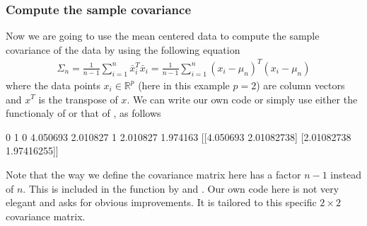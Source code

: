 \documentclass[letterpaper,10pt,english]{sphinxmanual}
\begin{document}
\subsubsection{Compute the sample covariance}
\label{\detokenize{chapter8:compute-the-sample-covariance}}
Now we are going to use the mean centered data to compute the sample covariance of the data by using the following equation
\begin{equation*}
\begin{split}
\Sigma_n = \frac{1}{n-1} \sum_{i=1}^n \bar{x}_i^T \bar{x}_i = \frac{1}{n-1} \sum_{i=1}^n (x_i - \mu_n)^T (x_i - \mu_n)
\end{split}
\end{equation*}
where the data points \(x_i \in \mathbb{R}^p\) (here in this example \(p = 2\)) are column vectors and \(x^T\) is the transpose of \(x\).
We can write our own code or simply use either the functionaly of  or that of , as follows

\begin{sphinxVerbatim}[commandchars=\\\{\}]
\end{sphinxVerbatim}

\begin{sphinxVerbatim}[commandchars=\\\{\}]
          0         1
0  4.050693  2.010827
1  2.010827  1.974163
[[4.050693   2.01082738]
 [2.01082738 1.97416255]]
\end{sphinxVerbatim}

Note that the way we define the covariance matrix here has a factor \(n-1\) instead of \(n\). This is included in the  function by  and .
Our own code here is not very elegant and asks for obvious improvements. It is tailored to this specific \(2\times 2\) covariance matrix.
\end{document}
